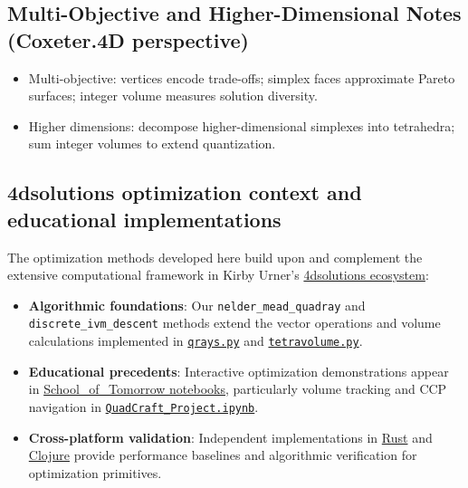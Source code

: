 \documentclass[
  10pt,
]{article}
\providecommand{\tightlist}{%
  \setlength{\itemsep}{0pt}\setlength{\parskip}{0pt}}
\begin{document}
\hypertarget{multi-objective-and-higher-dimensional-notes-coxeter.4d-perspective}{%
\subsection{Multi-Objective and Higher-Dimensional Notes (Coxeter.4D
perspective)}\label{multi-objective-and-higher-dimensional-notes-coxeter.4d-perspective}}

\begin{itemize}
\tightlist
\item
  Multi-objective: vertices encode trade-offs; simplex faces approximate
  Pareto surfaces; integer volume measures solution diversity.
\item
  Higher dimensions: decompose higher-dimensional simplexes into
  tetrahedra; sum integer volumes to extend quantization.
\end{itemize}

\hypertarget{dsolutions-optimization-context-and-educational-implementations}{%
\subsection{4dsolutions optimization context and educational
implementations}\label{dsolutions-optimization-context-and-educational-implementations}}

The optimization methods developed here build upon and complement the
extensive computational framework in Kirby Urner's
\href{https://github.com/4dsolutions}{4dsolutions ecosystem}:

\begin{itemize}
\item
  \textbf{Algorithmic foundations}: Our \texttt{nelder\_mead\_quadray}
  and \texttt{discrete\_ivm\_descent} methods extend the vector
  operations and volume calculations implemented in
  \href{https://github.com/4dsolutions/m4w/blob/main/qrays.py}{\texttt{qrays.py}}
  and
  \href{https://github.com/4dsolutions/m4w/blob/main/tetravolume.py}{\texttt{tetravolume.py}}.
\item
  \textbf{Educational precedents}: Interactive optimization
  demonstrations appear in
  \href{https://github.com/4dsolutions/School_of_Tomorrow}{School\_of\_Tomorrow
  notebooks}, particularly volume tracking and CCP navigation in
  \href{https://github.com/4dsolutions/School_of_Tomorrow/blob/master/QuadCraft_Project.ipynb}{\texttt{QuadCraft\_Project.ipynb}}.
\item
  \textbf{Cross-platform validation}: Independent implementations in
  \href{https://github.com/4dsolutions/rusty_rays}{Rust} and
  \href{https://github.com/4dsolutions/synmods}{Clojure} provide
  performance baselines and algorithmic verification for optimization
  primitives.
\end{itemize}
\end{document}
